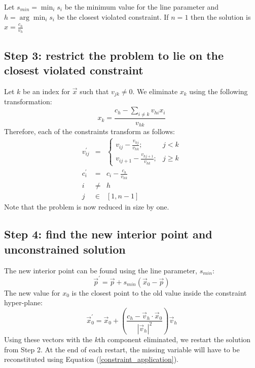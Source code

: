 \documentclass{article}
\begin{document}
Let $s_{min}=\min_i s_i$ be the minimum value for the line parameter and 
$h=\arg \min_i s_i$ be the closest violated constraint.
If $n=1$ then the solution is $x=\frac{c_h}{v_h}$

\subsection{Step 3: restrict the problem to lie on the closest violated constraint}

Let $k$ be an index for $\vec x$ such that $v_{jk} \ne 0$. 
We eliminate $x_k$ using the following transformation:
\begin{equation}
	x_k = \frac{c_h - \sum_{i \ne k} v_{hi} x_i}{v_{hk}}
	\label{constraint_application}
\end{equation}
Therefore, each of the constraints transform as follows:
\begin{eqnarray}
	v_{ij}^\prime & = & \left \lbrace \begin{array}{rc} 
	v_{ij} - \frac{v_{hj}}{v_{hk}} ; & j < k \\
	v_{ij+1} - \frac{v_{hj+1}}{v_{hk}} ; & j \ge k
	\end{array} \right . \\
	c_i^\prime & = & c_i - \frac{c_h}{v_{hk}} \\
	i & \ne & h \\
	j & \in & [1, n-1]
\end{eqnarray}
Note that the problem is now reduced in size by one.

\subsection{Step 4: find the new interior point and unconstrained solution}

The new interior point can be found using the line parameter, $s_{min}$:
\begin{equation}
	\vec p^\prime = \vec p + s_{min} (\vec x_0 - \vec p)
\end{equation}
The new value for $x_0$ is the closest point to the old value inside the
constraint hyper-plane:
\begin{equation}
	\vec x_0^\prime = \vec x_0 + \left ( \frac{c_h - \vec v_h \cdot \vec x_0}{| \vec v_h |^2} \right ) \vec v_h
\end{equation}
Using these vectors with the $k$th component eliminated, we restart the
solution from Step 2.
At the end of each restart, the missing variable will have to be reconstituted
using Equation (\ref{constraint_application}).

 
\end{document}
